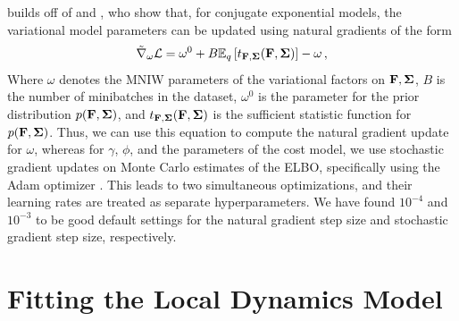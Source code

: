 \citet{Johnson2016} builds off of \citet{Hoffman2013} and \citet{Winn2005}, who show that, for conjugate exponential models, the variational model parameters can be updated using natural gradients of the form
\begin{equation}
    \tilde{\nabla}_{\omega}\mathcal{L}=\omega^0+B\mathbb{E}_q\left[t_{\mathbf{F},\bm{\Sigma}}(\mathbf{F},\bm{\Sigma})\right]-\omega\,,
\end{equation}
Where $\omega$ denotes the MNIW parameters of the variational factors on $\mathbf{F},\bm{\Sigma}$, $B$ is the number of minibatches in the dataset, $\omega^0$ is the parameter for the prior distribution $p(\mathbf{F},\bm{\Sigma})$, and $t_{\mathbf{F},\bm{\Sigma}}(\mathbf{F},\bm{\Sigma})$ is the sufficient statistic function for $p(\mathbf{F},\bm{\Sigma})$. Thus, we can use this equation to compute the natural gradient update for $\omega$, whereas for $\gamma$, $\phi$, and the parameters of the cost model, we use stochastic gradient updates on Monte Carlo estimates of the ELBO, specifically using the Adam optimizer \citep{Kingma2013}. This leads to two simultaneous optimizations, and their learning rates are treated as separate hyperparameters. We have found $10^{-4}$ and $10^{-3}$ to be good default settings for the natural gradient step size and stochastic gradient step size, respectively.


\section{Fitting the Local Dynamics Model}
\label{sec:supp-fit}

